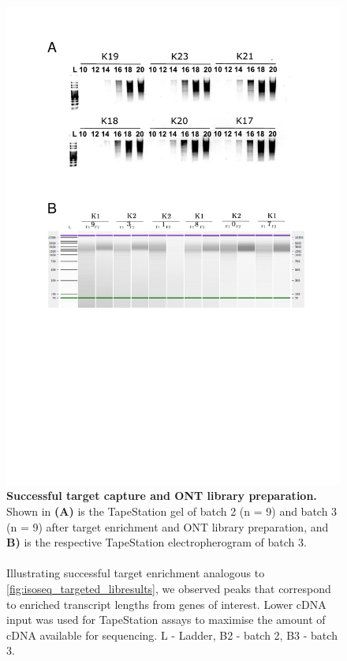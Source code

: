 \begin{figure}[!htp]
	\centering
	\vspace{20pt}
	\includegraphics[page=3,trim={0 17cm 0cm 0cm},clip,scale = 0.75]{Figures/TargetedTranscriptome_ppt.pdf}
	\captionsetup{width=0.95\textwidth}
	\caption[ONT targeted profiling - target capture \& library preparation]%
	{\textbf{Successful target capture and ONT library preparation.} Shown in \textbf{(A)} is the TapeStation gel of batch 2 (n = 9) and batch 3 (n = 9) after target enrichment and ONT library preparation, and \textbf{B)} is the respective TapeStation electropherogram of batch 3. 
	\\
	\\
	Illustrating successful target enrichment analogous to \cref{fig:isoseq_targeted_libresults}, we observed peaks that correspond to enriched transcript lengths from genes of interest. Lower cDNA input was used for TapeStation assays to maximise the amount of cDNA available for sequencing. L - Ladder, B2 - batch 2, B3 - batch 3.}  
	\label{fig:ONT_targeted_libresults}
\end{figure}

